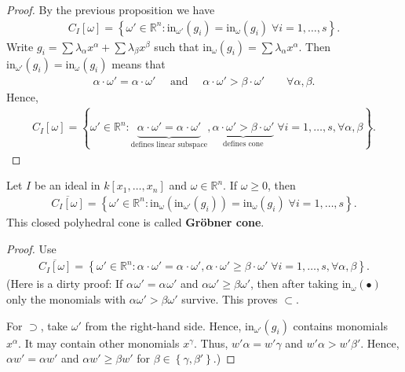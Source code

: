 \documentclass[a4paper, 11pt]{article}
\begin{document}
\begin{proof}
  By the previous proposition we have 
  \begin{align*}
    C_I[\omega] = \left\{ \omega' \in \mathbb R^n : \mathrm{in}_{\omega'}(g_i) = \mathrm{in}_\omega(g_i) \; \forall i = 1, \dots , s \right\}.
  \end{align*}
  Write \( g_i = \sum \lambda_{\alpha}  x^{\alpha} + \sum \lambda_{\beta} x^{\beta} \) such that \( \mathrm{in}_{\omega}(g_i) = \sum \lambda_\alpha x^{\alpha} \). Then \( \mathrm{in}_{\omega'}(g_i) = \mathrm{in}_\omega(g_i) \) means that 
  \begin{align*}
    \alpha \cdot \omega' = \alpha \cdot \omega' \quad \text{ and } \quad    \alpha \cdot \omega' > \beta \cdot \omega'\qquad  \forall \alpha, \beta.
  \end{align*}
  Hence, 
  \begin{align*}
    C_I[\omega] = \left\{ \omega' \in \mathbb R^n :    \underbrace{ \alpha_{} \cdot \omega' = \alpha_{} \cdot \omega'}_{\text{defines linear subspace}},  \underbrace{ \alpha \cdot \omega' > \beta \cdot \omega'}_{\text{defines cone}}  \; \forall i = 1, \dots , s, \forall \alpha, \beta \right\}.
  \end{align*}
\end{proof}

\begin{cor}
  Let \( I \) be an ideal in \( k[x_1, \dots, x_n] \) and \( \omega \in \mathbb R^n \). If \( \omega \geq 0 \), then 
  \begin{align*}
    \overline{C_I[\omega]} = \left\{ \omega ' \in \mathbb R^n : \mathrm{in}_\omega(\mathrm{in}_{\omega'}(g_i)) = \mathrm{in}_\omega(g_i) \; \forall i = 1, \dots, s \right\}.
  \end{align*}
  This closed polyhedral cone is called \textbf{Gröbner cone}.
\end{cor}

\begin{proof}
  Use 
  \begin{align*}
    \overline{C_I[\omega]} = \left\{ \omega' \in \mathbb R^n :    \alpha_{} \cdot \omega' = \alpha_{} \cdot \omega',   \alpha \cdot \omega' \geq \beta \cdot \omega'  \; \forall i = 1, \dots , s, \forall \alpha, \beta \right\}.
  \end{align*}
  (Here is a dirty proof: If \( \alpha_{}  \omega' = \alpha_{}  \omega' \) and \( \alpha \omega' \geq \beta \omega' \), then after taking \( \mathrm{in}_\omega(\bullet) \) only the monomials with \( \alpha \omega ' > \beta \omega ' \) survive. This proves \( \subset \).

  For \( \supset \), take \( \omega' \) from the right-hand side. Hence, \( \mathrm{in}_{\omega'}(g_i) \) contains monomials \( x^\alpha \). It may contain other monomials \( x^\gamma \). Thus, \( w' \alpha = w' \gamma \) and \( w' \alpha >  w' \beta' \). Hence, \( \alpha w ' = \alpha w' \) and \( \alpha w' \geq \beta w' \) for \( \beta\in \left\{ \gamma, \beta' \right\} \).)
  
\end{proof}
\end{document}
